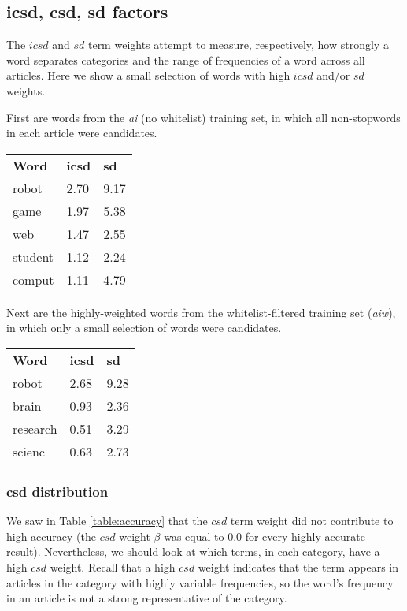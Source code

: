 \documentclass{article}
\begin{document}
\subsection{icsd, csd, sd factors}

The $icsd$ and $sd$ term weights attempt to measure, respectively, how strongly
a word separates categories and the range of frequencies of a word across all
articles. Here we show a small selection of words with high $icsd$ and/or $sd$
weights.

First are words from the \textit{ai} (no whitelist) training set, in which all
non-stopwords in each article were candidates.

\begin{center}
  \begin{tabular}{lll}
    {\textbf{Word}} & {\textbf{icsd}} & {\textbf{sd}}\\
    robot & 2.70 & 9.17\\
    game & 1.97 & 5.38\\
    web & 1.47 & 2.55\\
    student & 1.12 & 2.24\\
    comput & 1.11 & 4.79\\
  \end{tabular}
\end{center}

Next are the highly-weighted words from the whitelist-filtered training set
(\textit{aiw}), in which only a small selection of words were candidates.

\begin{center}
  \begin{tabular}{lll}
    {\textbf{Word}} & {\textbf{icsd}} & {\textbf{sd}}\\
    robot & 2.68 & 9.28\\
    brain & 0.93 & 2.36\\
    research & 0.51 & 3.29\\
    scienc & 0.63 & 2.73
  \end{tabular}
\end{center}

\subsubsection{csd distribution}

We saw in Table \ref{table:accuracy} that the $csd$ term weight did not
contribute to high accuracy (the $csd$ weight $\beta$ was equal to 0.0 for
every highly-accurate result). Nevertheless, we should look at which terms, in
each category, have a high $csd$ weight. Recall that a high $csd$ weight
indicates that the term appears in articles in the category with highly
variable frequencies, so the word's frequency in an article is not a strong
representative of the category.
\end{document}
